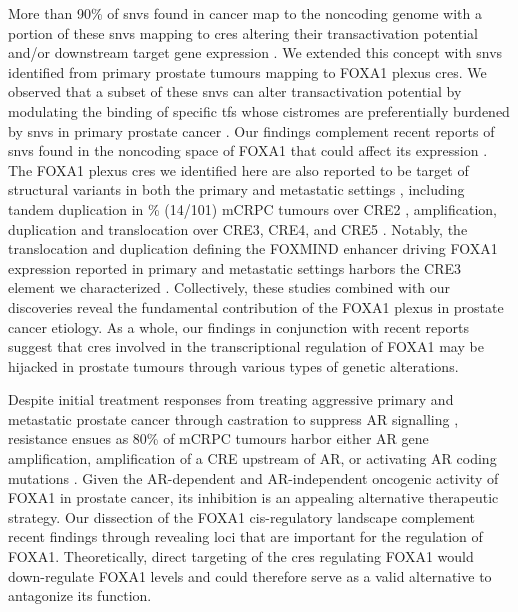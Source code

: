 More than 90\% of \glspl{snv} found in cancer map to the noncoding genome \cite{meltonRecurrentSomaticMutations2015,mazrooeiCistromePartitioningReveals2019} with a portion of these \glspl{snv} mapping to \glspl{cre} altering their transactivation potential \cite{baileyNoncodingSomaticInherited2016,zhangIntegrativeFunctionalGenomics2012,huangHighlyRecurrentTERT2013,hornTERTPromoterMutations2013} and/or downstream target gene expression \cite{zhouEmergenceNoncodingCancer2016,meltonRecurrentSomaticMutations2015,weinholdGenomewideAnalysisNoncoding2014}.
We extended this concept with \glspl{snv} identified from primary prostate tumours mapping to FOXA1 plexus \glspl{cre}.
We observed that a subset of these \glspl{snv} can alter transactivation potential by modulating the binding of specific \glspl{tf} whose cistromes are preferentially burdened by \glspl{snv} in primary prostate cancer \cite{mazrooeiCistromePartitioningReveals2019}.
Our findings complement recent reports of \glspl{snv} found in the noncoding space of FOXA1 that could affect its expression \cite{annalaFrequentMutationFOXA12018,camcapstudygroupSequencingProstateCancers2018}.
The FOXA1 plexus \glspl{cre} we identified here are also reported to be target of structural variants in both the primary and metastatic settings \cite{paroliaDistinctStructuralClasses2019,quigleyGenomicHallmarksStructural2018}, including tandem duplication in \% (14/101) mCRPC tumours over CRE2 \cite{quigleyGenomicHallmarksStructural2018}, amplification, duplication and translocation over CRE3, CRE4, and CRE5 \cite{paroliaDistinctStructuralClasses2019}.
Notably, the translocation and duplication defining the FOXMIND enhancer driving FOXA1 expression reported in primary and metastatic settings harbors the CRE3 element we characterized \cite{paroliaDistinctStructuralClasses2019}.
Collectively, these studies combined with our discoveries reveal the fundamental contribution of the FOXA1 plexus in prostate cancer etiology.
As a whole, our findings in conjunction with recent reports suggest that \glspl{cre} involved in the transcriptional regulation of FOXA1 may be hijacked in prostate tumours through various types of genetic alterations.

Despite initial treatment responses from treating aggressive primary and metastatic prostate cancer through castration to suppress AR signalling \cite{attardProstateCancer2016}, resistance ensues as 80\% of mCRPC tumours harbor either AR gene amplification, amplification of a CRE upstream of AR, or activating AR coding mutations \cite{robinsonIntegrativeClinicalGenomics2015,takedaSomaticallyAcquiredEnhancer2018,quigleyGenomicHallmarksStructural2018}.
Given the AR-dependent \cite{yangCurrentPerspectivesFOXA12015,pomerantzAndrogenReceptorCistrome2015} and AR-independent \cite{sunkelIntegrativeAnalysisIdentifies2017} oncogenic activity of FOXA1 in prostate cancer, its inhibition is an appealing alternative therapeutic strategy.
Our dissection of the FOXA1 cis-regulatory landscape complement recent findings through revealing loci that are important for the regulation of FOXA1.
Theoretically, direct targeting of the \glspl{cre} regulating FOXA1 would down-regulate FOXA1 levels and could therefore serve as a valid alternative to antagonize its function.

